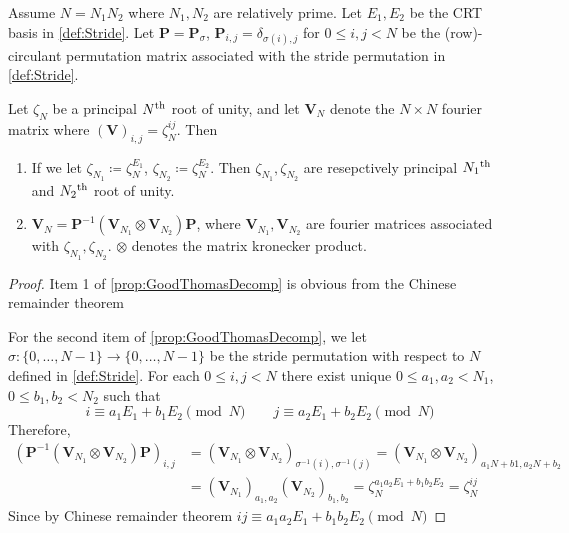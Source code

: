 \begin{proposition}\label{prop:GoodThomasDecomp}
    Assume \(N = N_1 N_2\) where \(N_1, N_2\) are relatively prime. Let \(E_1, E_2\) be the CRT basis in \cref{def:Stride}. Let \(\bm{P} = \bm{P}_{\sigma}\), \(\bm{P}_{i,j} = \delta_{\sigma(i), j}\) for \(0 \le i,j < N\) be the (row)-circulant permutation matrix associated with the stride permutation in \cref{def:Stride}.
    
    Let \(\zeta_N\) be a principal \(N\textsuperscript{th}\) root of unity, and let \(\bm{V}_N\) denote the \(N \times N\) fourier matrix where \((\bm{V})_{i,j} = \zeta_N^{ij}\). Then
    \begin{enumerate}
        \item If we let \(\zeta_{N_1} \coloneq \zeta_N^{E_1}\), \(\zeta_{N_2} \coloneq \zeta_N^{E_2}\). Then \(\zeta_{N_1}, \zeta_{N_2}\) are resepctively principal \(N_1\textsuperscript{th}\) and \(N_2\textsuperscript{th}\) root of unity.
        \item \(\bm{V}_N = \bm{P}^{-1} (\bm{V}_{N_1} \otimes \bm{V}_{N_2}) \bm{P}\), where \(\bm{V}_{N_1}, \bm{V}_{N_2}\) are fourier matrices associated with \(\zeta_{N_1}, \zeta_{N_2}\). \(\otimes\) denotes the matrix kronecker product.
    \end{enumerate}
\end{proposition}
\begin{proof}
    Item 1 of \cref{prop:GoodThomasDecomp} is obvious from the Chinese remainder theorem

    For the second item of \cref{prop:GoodThomasDecomp}, we let \(\sigma: \{0,\ldots,N-1\} \to \{0,\ldots,N-1\}\) be the stride permutation with respect to \(N\) defined in \cref{def:Stride}. For each \(0 \le i,j < N\) there exist unique \(0 \le a_1, a_2 < N_1\), \(0 \le b_1,b_2 < N_2\) such that
    \[i \equiv a_1 E_1 + b_1 E_2 \pmod{N} \qquad j \equiv a_2 E_1 + b_2 E_2 \pmod{N}\]
    Therefore,
    \begin{align*}
        \left(\bm{P}^{-1} (\bm{V}_{N_1} \otimes \bm{V}_{N_2}) \bm{P}\right)_{i,j} &= \left(\bm{V}_{N_1} \otimes \bm{V}_{N_2}\right)_{\sigma^{-1}(i), \sigma^{-1}(j)} = \left(\bm{V}_{N_1} \otimes \bm{V}_{N_2}\right)_{a_1 N + b1, a_2 N + b_2} \\
        &= (\bm{V}_{N_1})_{a_1, a_2} (\bm{V}_{N_2})_{b_1, b_2} = \zeta_N^{a_1 a_2 E_1 + b_1 b_2 E_2} = \zeta_N^{ij}
    \end{align*}
    Since by Chinese remainder theorem \(ij \equiv a_1 a_2 E_1 + b_1 b_2 E_2 \pmod{N}\)
\end{proof}

